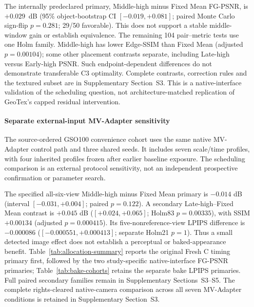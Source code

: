 \documentclass[times,twocolumn,final]{elsarticle}
\begin{document}
The internally predeclared primary, Middle-high minus Fixed Mean FG-PSNR, is $+0.029$~dB (95\% object-bootstrap CI $[-0.019,+0.081]$; paired Monte Carlo sign-flip $p=0.281$; 29/50 favorable). This does not support a stable middle-window gain or establish equivalence. The remaining 104 pair--metric tests use one Holm family. Middle-high has lower Edge-SSIM than Fixed Mean (adjusted $p=0.00104$); some other placement contrasts separate, including Late-high versus Early-high PSNR. Such endpoint-dependent differences do not demonstrate transferable C3 optimality. Complete contrasts, correction rules and the textured subset are in Supplementary Section~S3. This is a native-interface validation of the scheduling question, not architecture-matched replication of GeoTex's capped residual intervention.


\paragraph{Separate external-input MV-Adapter sensitivity}
The source-ordered GSO100 convenience cohort uses the same native MV-Adapter control path and three shared seeds. It includes seven scale/time profiles, with four inherited profiles frozen after earlier baseline exposure. The scheduling comparison is an external protocol sensitivity, not an independent prospective confirmation or parameter search.

The specified all-six-view Middle-high minus Fixed Mean primary is $-0.014$ dB (interval $[-0.031,+0.004]$; paired $p=0.122$). A secondary Late-high--Fixed Mean contrast is $+0.045$ dB ($[+0.024,+0.065]$; Holm83 $p=0.00335$), with SSIM $+0.00134$ (adjusted $p=0.000415$). Its five-nonreference-view LPIPS difference is $-0.000086$ ($[-0.000551,+0.000413]$; separate Holm21 $p=1$). Thus a small detected image effect does not establish a perceptual or baked-appearance benefit. Table~\ref{tab:allocation-summary} reports the original Fresh C timing primary first, followed by the two study-specific native-interface FG-PSNR primaries; Table~\ref{tab:bake-cohorts} retains the separate bake LPIPS primaries. Full paired secondary families remain in Supplementary Sections~S3--S5. The complete rights-cleared native-camera comparison across all seven MV-Adapter conditions is retained in Supplementary Section~S3.
\end{document}
